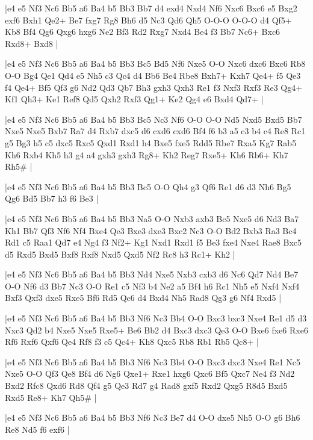 \whitename{}
\blackname{}
\makegametitle
|e4 e5 Nf3 Nc6 Bb5 a6 Ba4 b5 Bb3 Bb7 d4 exd4 Nxd4 Nf6 Nxc6 Bxc6 e5 Bxg2 exf6 Bxh1 Qe2+ Be7 fxg7 Rg8 Bh6 d5 Nc3 Qd6 Qh5 O-O-O O-O-O d4 Qf5+ Kb8 Bf4 Qg6 Qxg6 hxg6 Ne2 Bf3 Rd2 Rxg7 Nxd4 Be4 f3 Bb7 Nc6+ Bxc6 Rxd8+ Bxd8  |

\whitename{}
\blackname{}
\makegametitle
|e4 e5 Nf3 Nc6 Bb5 a6 Ba4 b5 Bb3 Bc5 Bd5 Nf6 Nxe5 O-O Nxc6 dxc6 Bxc6 Rb8 O-O Bg4 Qe1 Qd4 e5 Nh5 c3 Qc4 d4 Bb6 Be4 Rbe8 Bxh7+ Kxh7 Qe4+ f5 Qe3 f4 Qe4+ Bf5 Qf3 g6 Nd2 Qd3 Qb7 Bh3 gxh3 Qxh3 Re1 f3 Nxf3 Rxf3 Re3 Qg4+ Kf1 Qh3+ Ke1 Ref8 Qd5 Qxh2 Rxf3 Qg1+ Ke2 Qg4 e6 Bxd4 Qd7+  |

\whitename{}
\blackname{}
\makegametitle
|e4 e5 Nf3 Nc6 Bb5 a6 Ba4 b5 Bb3 Bc5 Nc3 Nf6 O-O O-O Nd5 Nxd5 Bxd5 Bb7 Nxe5 Nxe5 Bxb7 Ra7 d4 Rxb7 dxc5 d6 cxd6 cxd6 Bf4 f6 b3 a5 c3 b4 c4 Re8 Rc1 g5 Bg3 h5 c5 dxc5 Rxc5 Qxd1 Rxd1 h4 Bxe5 fxe5 Rdd5 Rbe7 Rxa5 Kg7 Rab5 Kh6 Rxb4 Kh5 h3 g4 a4 gxh3 gxh3 Rg8+ Kh2 Reg7 Rxe5+ Kh6 Rb6+ Kh7 Rh5\#  |

\whitename{}
\blackname{}
\makegametitle
|e4 e5 Nf3 Nc6 Bb5 a6 Ba4 b5 Bb3 Bc5 O-O Qh4 g3 Qf6 Re1 d6 d3 Nh6 Bg5 Qg6 Bd5 Bb7 h3 f6 Be3  |

\whitename{}
\blackname{}
\makegametitle
|e4 e5 Nf3 Nc6 Bb5 a6 Ba4 b5 Bb3 Na5 O-O Nxb3 axb3 Bc5 Nxe5 d6 Nd3 Ba7 Kh1 Bb7 Qf3 Nf6 Nf4 Bxe4 Qe3 Bxe3 dxe3 Bxc2 Nc3 O-O Bd2 Bxb3 Ra3 Bc4 Rd1 c5 Raa1 Qd7 e4 Ng4 f3 Nf2+ Kg1 Nxd1 Rxd1 f5 Be3 fxe4 Nxe4 Rae8 Bxc5 d5 Rxd5 Bxd5 Bxf8 Rxf8 Nxd5 Qxd5 Nf2 Rc8 h3 Rc1+ Kh2  |

\whitename{}
\blackname{}
\makegametitle
|e4 e5 Nf3 Nc6 Bb5 a6 Ba4 b5 Bb3 Nd4 Nxe5 Nxb3 cxb3 d6 Nc6 Qd7 Nd4 Be7 O-O Nf6 d3 Bb7 Nc3 O-O Re1 c5 Nf3 b4 Ne2 a5 Bf4 h6 Rc1 Nh5 e5 Nxf4 Nxf4 Bxf3 Qxf3 dxe5 Rxe5 Bf6 Rd5 Qc6 d4 Bxd4 Nh5 Rad8 Qg3 g6 Nf4 Rxd5  |

\whitename{}
\blackname{}
\makegametitle
|e4 e5 Nf3 Nc6 Bb5 a6 Ba4 b5 Bb3 Nf6 Nc3 Bb4 O-O Bxc3 bxc3 Nxe4 Re1 d5 d3 Nxc3 Qd2 b4 Nxe5 Nxe5 Rxe5+ Be6 Bb2 d4 Bxc3 dxc3 Qe3 O-O Bxe6 fxe6 Rxe6 Rf6 Rxf6 Qxf6 Qe4 Rf8 f3 c5 Qc4+ Kh8 Qxc5 Rb8 Rb1 Rb5 Qc8+  |

\whitename{}
\blackname{}
\makegametitle
|e4 e5 Nf3 Nc6 Bb5 a6 Ba4 b5 Bb3 Nf6 Nc3 Bb4 O-O Bxc3 dxc3 Nxe4 Re1 Nc5 Nxe5 O-O Qf3 Qe8 Bf4 d6 Ng6 Qxe1+ Rxe1 hxg6 Qxc6 Bf5 Qxc7 Ne4 f3 Nd2 Bxd2 Rfc8 Qxd6 Rd8 Qf4 g5 Qe3 Rd7 g4 Rad8 gxf5 Rxd2 Qxg5 R8d5 Bxd5 Rxd5 Re8+ Kh7 Qh5\#  |

\whitename{}
\blackname{}
\makegametitle
|e4 e5 Nf3 Nc6 Bb5 a6 Ba4 b5 Bb3 Nf6 Nc3 Be7 d4 O-O dxe5 Nh5 O-O g6 Bh6 Re8 Nd5 f6 exf6  |

